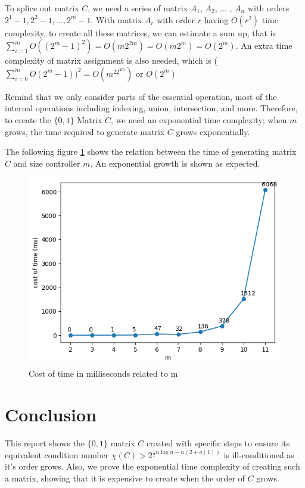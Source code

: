 \documentclass[11pt]{article}
\begin{document}
To splice out matrix $C$, we need a series of matrix $A_1$, $A_2$, ... , $A_n$ with orders $2^1-1, 2^2-1, ..., 2^m-1$. With matrix $A_r$ with order $r$ having $O(r^2)$ time complexity, to create all these matrices, we can estimate a sum up, that is $\sum_{i=1}^{m}O((2^m - 1)^2) = O(m2^{2m}) = O(m2^m) = O(2^m)$. An extra time complexity of matrix assignment is also needed, which is ($\sum_{i=0}^{m}O(2^m - 1))^2 = O(m^22^{2m})$ or $O(2^m)$

Remind that we only consider parts of the essential operation, most of the internal operations including indexing, union, intersection, and more. Therefore, to create the $\{0, 1\}$ Matrix $C$, we need an exponential time complexity; when $m$ grows, the time required to generate matrix $C$ grows exponentially.

The following figure \ref{costoftime} shows the relation between the time of generating matrix $C$ and size controller $m$. An exponential growth is shown as expected.

\begin{figure}[htp]
    \centering
    \includegraphics{fig/output.png}
    \caption{Cost of time in milliseconds related to m}\label{costoftime}
\end{figure}

\section{Conclusion}
This report shows the $\{0, 1\}$ matrix $C$ created with specific steps to ensure its equivalent condition number $\chi(C) > 2^{\frac{1}{2}n\log n-n(2+o(1))}$ is ill-conditioned as it's order grows. Also, we prove the exponential time complexity of creating such a matrix, showing that it is expensive to create when the order of $C$ grows.
\end{document}
